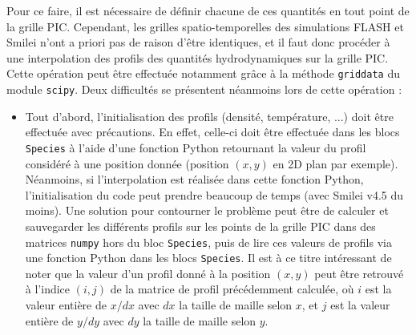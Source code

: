 Pour ce faire, il est nécessaire de définir chacune de ces quantités en tout point de la grille PIC. Cependant, les grilles spatio-temporelles des simulations FLASH et Smilei n'ont a priori pas de raison d'être identiques, et il faut donc procéder à une interpolation des profils des quantités hydrodynamiques sur la grille PIC.
Cette opération peut être effectuée notamment grâce à la méthode \texttt{griddata} du module \texttt{scipy}. Deux difficultés se présentent néanmoins lors de cette opération :
\begin{itemize}
    \item Tout d'abord, l'initialisation des profils (densité, température, ...) doit être effectuée avec précautions. En effet, celle-ci doit être effectuée dans les blocs \texttt{Species} à l'aide d'une fonction Python retournant la valeur du profil considéré à une position donnée (position $(x,y)$ en 2D plan par exemple). Néanmoins, si l'interpolation est réalisée dans cette fonction Python, l'initialisation du code peut prendre beaucoup de temps (avec Smilei v4.5 du moins). 
    Une solution pour contourner le problème peut être de calculer et sauvegarder les différents profils sur les points de la grille PIC dans des matrices \texttt{numpy} hors du bloc \texttt{Species}, puis de lire ces valeurs de profils via une fonction Python dans les blocs \texttt{Species}. 
    Il est à ce titre intéressant de noter que la valeur d'un profil donné à la position $(x,y)$ peut être retrouvé à l'indice $(i,j)$ de la matrice de profil précédemment calculée, où $i$ est la valeur entière de $x/dx$ avec $dx$ la taille de maille selon $x$, et $j$ est la valeur entière de $y/dy$ avec $dy$ la taille de maille selon $y$.
    

\end{itemize}
